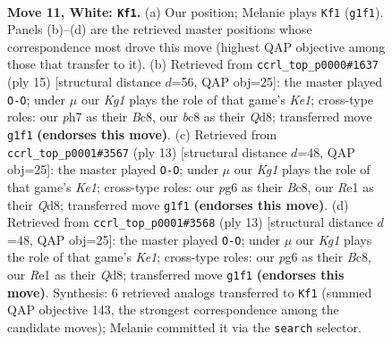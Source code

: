 \documentclass[11pt]{article}
\begin{document}
\clearpage

\begin{figure}[p]\centering
\begin{subfigure}{0.46\textwidth}\centering
\resizebox{\linewidth}{!}{%
\newchessgame
\chessboard[
  setfen={r1bq1rk1/pp1p1pbp/2n3p1/2p1p2n/2P4P/4PNP1/PP1P1PB1/RNBQR1K1 w - - 2 11},
  showmover=false,
  pgfstyle=straightmove, color=movearrow, markmove={g1-f1}
]}
\caption{}
\end{subfigure}\hfill
\begin{subfigure}{0.46\textwidth}\centering
\resizebox{\linewidth}{!}{%
\newchessgame
\chessboard[
  setfen={r1bqk2r/1pp2pbp/2np1np1/p3p3/2P5/2NP1NP1/PP2PPBP/1RBQ1RK1 b kq - 1 8},
  showmover=false,
  pgfstyle=straightmove, color=movearrow, markmove={e8-g8}
]}
\caption{}
\end{subfigure}
\\[4pt]
\begin{subfigure}{0.46\textwidth}\centering
\resizebox{\linewidth}{!}{%
\newchessgame
\chessboard[
  setfen={r1bqk2r/ppp2pbp/2np1np1/4p3/2P5/2NP1NP1/PP2PPBP/R1BQ1RK1 b kq - 2 7},
  showmover=false,
  pgfstyle=straightmove, color=movearrow, markmove={e8-g8}
]}
\caption{}
\end{subfigure}\hfill
\begin{subfigure}{0.46\textwidth}\centering
\resizebox{\linewidth}{!}{%
\newchessgame
\chessboard[
  setfen={r1bqk2r/ppp2pbp/2np1np1/4p3/2P5/2NP1NP1/PP2PPBP/R1BQ1RK1 b kq - 2 7},
  showmover=false,
  pgfstyle=straightmove, color=movearrow, markmove={e8-g8}
]}
\caption{}
\end{subfigure}
\caption{\textbf{Move 11, White: \texttt{Kf1}.} (a) Our position; Melanie plays \texttt{Kf1} (\texttt{g1f1}). Panels (b)--(d) are the retrieved master positions whose correspondence most drove this move (highest QAP objective among those that transfer to it). (b) Retrieved from \texttt{ccrl\_top\_p0000\#1637} (ply 15) [structural distance $d$=56, QAP obj=25]: the master played \texttt{O-O}; under $\mu$ our \emph{Kg1} plays the role of that game's \emph{Ke1}; cross-type roles: our \emph{p}h7 as their \emph{B}c8, our \emph{b}c8 as their \emph{Q}d8; transferred move \texttt{g1f1} \textbf{(endorses this move)}. (c) Retrieved from \texttt{ccrl\_top\_p0001\#3567} (ply 13) [structural distance $d$=48, QAP obj=25]: the master played \texttt{O-O}; under $\mu$ our \emph{Kg1} plays the role of that game's \emph{Ke1}; cross-type roles: our \emph{p}g6 as their \emph{B}c8, our \emph{R}e1 as their \emph{Q}d8; transferred move \texttt{g1f1} \textbf{(endorses this move)}. (d) Retrieved from \texttt{ccrl\_top\_p0001\#3568} (ply 13) [structural distance $d$=48, QAP obj=25]: the master played \texttt{O-O}; under $\mu$ our \emph{Kg1} plays the role of that game's \emph{Ke1}; cross-type roles: our \emph{p}g6 as their \emph{B}c8, our \emph{R}e1 as their \emph{Q}d8; transferred move \texttt{g1f1} \textbf{(endorses this move)}. Synthesis: 6 retrieved analogs transferred to \texttt{Kf1} (summed QAP objective 143, the strongest correspondence among the candidate moves); Melanie committed it via the \texttt{search} selector.}
\label{fig:thought-m20}
\end{figure}
\end{document}
